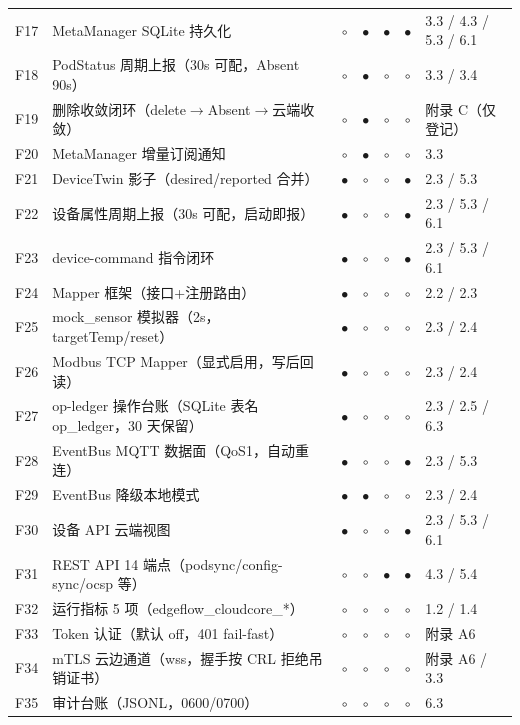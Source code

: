 {\begin{longtable}{p{1.0cm}p{4.6cm}ccccp{3.2cm}}
F17 & MetaManager SQLite 持久化 & $\circ$ & $\bullet$ & $\bullet$ & $\bullet$ & 3.3 / 4.3 / 5.3 / 6.1\\
F18 & PodStatus 周期上报（30s 可配，Absent 90s） & $\circ$ & $\bullet$ & $\circ$ & $\circ$ & 3.3 / 3.4\\
F19 & 删除收敛闭环（delete$\rightarrow$Absent$\rightarrow$云端收敛） & $\circ$ & $\bullet$ & $\circ$ & $\circ$ & 附录 C（仅登记）\\
F20 & MetaManager 增量订阅通知 & $\circ$ & $\bullet$ & $\circ$ & $\circ$ & 3.3\\
F21 & DeviceTwin 影子（desired/reported 合并） & $\bullet$ & $\circ$ & $\circ$ & $\bullet$ & 2.3 / 5.3\\
F22 & 设备属性周期上报（30s 可配，启动即报） & $\bullet$ & $\circ$ & $\circ$ & $\bullet$ & 2.3 / 5.3 / 6.1\\
F23 & device-command 指令闭环 & $\bullet$ & $\circ$ & $\circ$ & $\bullet$ & 2.3 / 5.3 / 6.1\\
F24 & Mapper 框架（接口+注册路由） & $\bullet$ & $\circ$ & $\circ$ & $\circ$ & 2.2 / 2.3\\
F25 & mock\_sensor 模拟器（2s，targetTemp/reset） & $\bullet$ & $\circ$ & $\circ$ & $\circ$ & 2.3 / 2.4\\
F26 & Modbus TCP Mapper（显式启用，写后回读） & $\bullet$ & $\circ$ & $\circ$ & $\circ$ & 2.3 / 2.4\\
F27 & op-ledger 操作台账（SQLite 表名 op\_ledger，30 天保留） & $\bullet$ & $\circ$ & $\circ$ & $\circ$ & 2.3 / 2.5 / 6.3\\
F28 & EventBus MQTT 数据面（QoS1，自动重连） & $\bullet$ & $\circ$ & $\circ$ & $\bullet$ & 2.3 / 5.3\\
F29 & EventBus 降级本地模式 & $\bullet$ & $\bullet$ & $\circ$ & $\circ$ & 2.3 / 2.4\\
F30 & 设备 API 云端视图 & $\bullet$ & $\circ$ & $\circ$ & $\bullet$ & 2.3 / 5.3 / 6.1\\
F31 & REST API 14 端点（podsync/config-sync/ocsp 等） & $\circ$ & $\circ$ & $\bullet$ & $\bullet$ & 4.3 / 5.4\\
F32 & 运行指标 5 项（edgeflow\_cloudcore\_*） & $\circ$ & $\circ$ & $\circ$ & $\circ$ & 1.2 / 1.4\\
F33 & Token 认证（默认 off，401 fail-fast） & $\circ$ & $\circ$ & $\circ$ & $\circ$ & 附录 A6\\
F34 & mTLS 云边通道（wss，握手按 CRL 拒绝吊销证书） & $\circ$ & $\circ$ & $\circ$ & $\circ$ & 附录 A6 / 3.3\\
F35 & 审计台账（JSONL，0600/0700） & $\circ$ & $\circ$ & $\circ$ & $\circ$ & 6.3\\

\end{longtable}}
